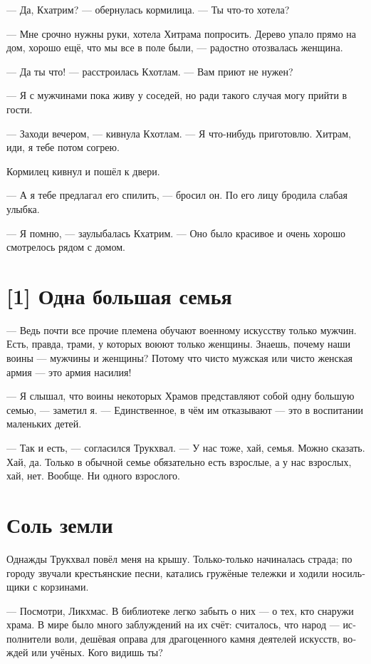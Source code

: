 \documentclass[a4paper,12pt,fleqn]{book}\usepackage{cooltooltips}\usepackage{polyglossia}\setdefaultlanguage[babelshorthands=true]{russian}\setotherlanguage{english}\defaultfontfeatures{Ligatures=TeX,Mapping=tex-text} \usepackage{xcolor}\definecolor{lightgray}{HTML}{bbbbbb}\color{lightgray}\newcommand{\ml}[3]{\textenglish{\textcolor{black}{#3}}}
\begin{document}
{--- Да, Кхатрим? --- обернулась кормилица.
--- Ты что-то хотела?

--- Мне срочно нужны руки, хотела Хитрама попросить.
Дерево упало прямо на дом, хорошо ещё, что мы все в поле были, --- радостно отозвалась женщина.

--- Да ты что! --- расстроилась Кхотлам.
--- Вам приют не нужен?

--- Я с мужчинами пока живу у соседей, но ради такого случая могу прийти в гости.

--- Заходи вечером, --- кивнула Кхотлам.
--- Я что-нибудь приготовлю.
Хитрам, иди, я тебе потом согрею.

Кормилец кивнул и пошёл к двери.

--- А я тебе предлагал его спилить, --- бросил он.
По его лицу бродила слабая улыбка.

--- Я помню, --- заулыбалась Кхатрим.
--- Оно было красивое и очень хорошо смотрелось рядом с домом.

\section{[1] Одна большая семья}

--- Ведь почти все прочие племена обучают военному искусству только мужчин.
Есть, правда, трами, у которых воюют только женщины.
Знаешь, почему наши воины --- мужчины и женщины?
Потому что чисто мужская или чисто женская армия --- это армия насилия!

--- Я слышал, что воины некоторых Храмов представляют собой одну большую семью, --- заметил я.
--- Единственное, в чём им отказывают --- это в воспитании маленьких детей.

--- Так и есть, --- согласился Трукхвал.
--- У нас тоже, хай, семья.
Можно сказать.
Хай, да.
Только в обычной семье обязательно есть взрослые, а у нас взрослых, хай, нет.
Вообще.
Ни одного взрослого.

\section{Соль земли}

Однажды Трукхвал повёл меня на крышу.
Только-только начиналась страда;
по городу звучали крестьянские песни, катались гружёные тележки и ходили носильщики с корзинами.

--- Посмотри, Ликхмас.
В библиотеке легко забыть о них --- о тех, кто снаружи храма.
В мире было много заблуждений на их счёт: считалось, что народ --- исполнители воли, дешёвая оправа для драгоценного камня деятелей искусств, вождей или учёных.
Кого видишь ты?

}
\end{document}
